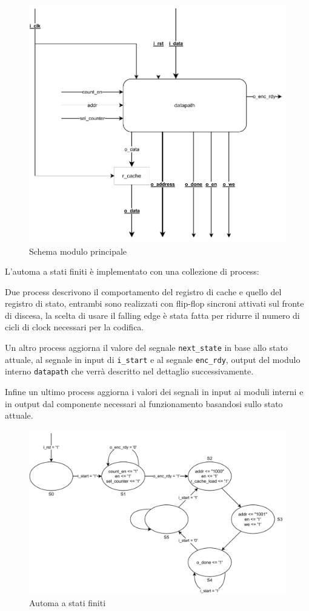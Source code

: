 \documentclass[a4paper]{article}
\begin{document}
\begin{figure}[H]
  \includegraphics[width=12cm]{schema-main.pdf}
  \caption{Schema modulo principale}
\end{figure}

L'automa a stati finiti è implementato con una collezione di process:

Due process descrivono il comportamento del registro di cache e quello del registro di stato, entrambi sono realizzati con flip-flop sincroni attivati sul fronte di discesa, la scelta di usare il falling edge è stata fatta per ridurre il numero di cicli di clock necessari per la codifica.

Un altro process aggiorna il valore del segnale \texttt{next\_state} in base allo stato attuale, al segnale in input di \texttt{i\_start} e al segnale \texttt{enc\_rdy}, output del modulo interno \texttt{datapath} che verrà descritto nel dettaglio successivamente.

Infine un ultimo process aggiorna i valori dei segnali in input ai moduli interni e in output dal componente necessari al funzionamento basandosi sullo stato attuale.

\begin{figure}[H]
  \centering
  \includegraphics[width=12.5cm]{schema-fsa.pdf}
  \caption{Automa a stati finiti}
\end{figure}
\end{document}
